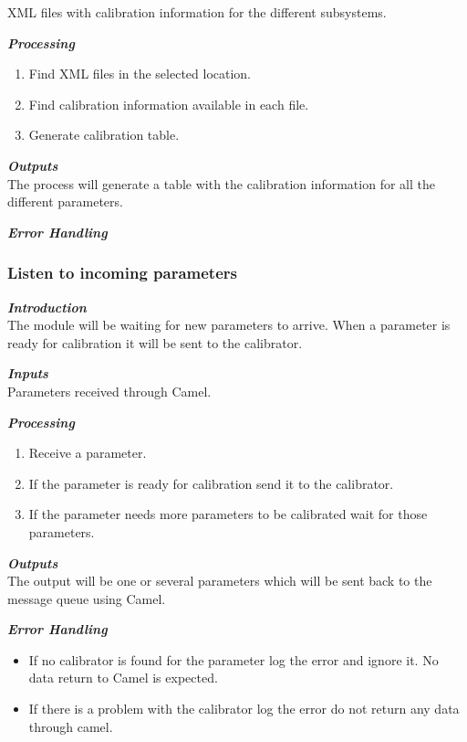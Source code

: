 XML files with calibration information for the different subsystems.

\textbf{\emph{Processing}}\\
\begin{enumerate}
\item Find XML files in the selected location.
\item Find calibration information available in each file.
\item Generate calibration table.
\end{enumerate}

\textbf{\emph{Outputs}}\\

The process will generate a table with the calibration information for all the different parameters.

\textbf{\emph{Error Handling}}\\



\subsubsection{Listen to incoming parameters}

\textbf{\emph{Introduction}}\\
The module will be waiting for new parameters to arrive. When a parameter is ready for calibration it will be sent to the calibrator.

\textbf{\emph{Inputs}}\\

Parameters received through Camel.

\textbf{\emph{Processing}}\\
\begin{enumerate}
\item Receive a parameter.
\item If the parameter is ready for calibration send it to the calibrator.
\item If the parameter needs more parameters to be calibrated wait for those parameters.
\end{enumerate}

\textbf{\emph{Outputs}}\\

The output will be one or several parameters which will be sent back to the message queue using Camel.


\textbf{\emph{Error Handling}}\\
\begin{itemize}
\item If no calibrator is found for the parameter log the error and ignore it. No data return to Camel is expected.
\item If there is a problem with the calibrator log the error do not return any data through camel.
\end{itemize}


